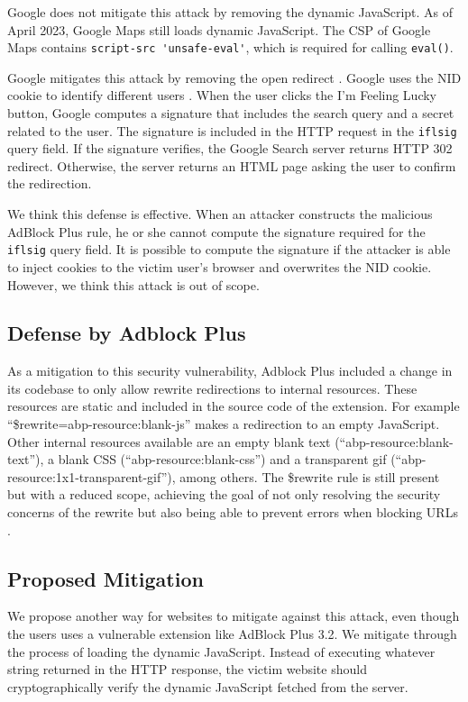 \documentclass[conference]{IEEEtran}
\begin{document}
Google does not mitigate this attack by removing the dynamic JavaScript. As of April 2023, Google Maps still loads dynamic JavaScript. The CSP of Google Maps contains \lstinline{script-src 'unsafe-eval'}, which is required for calling \lstinline{eval()}.

Google mitigates this attack by removing the open redirect \cite{superuser_ifl_redir_notice}. Google uses the NID cookie to identify different users \cite{google_cookies}. When the user clicks the I'm Feeling Lucky button, Google computes a signature that includes the search query and a secret related to the user. The signature is included in the HTTP request in the \lstinline{iflsig} query field. If the signature verifies, the Google Search server returns HTTP 302 redirect. Otherwise, the server returns an HTML page asking the user to confirm the redirection.

We think this defense is effective. When an attacker constructs the malicious AdBlock Plus rule, he or she cannot compute the signature required for the \lstinline{iflsig} query field. It is possible to compute the signature if the attacker is able to inject cookies to the victim user's browser and overwrites the NID cookie. However, we think this attack is out of scope.

\subsection{Defense by Adblock Plus}
As a mitigation to this security vulnerability, Adblock Plus included a change in its codebase to only allow rewrite redirections to internal resources. These resources are static and included in the source code of the extension. For example ``\$rewrite=abp-resource:blank-js'' makes a redirection to an empty JavaScript. Other internal resources available are an empty blank text (``abp-resource:blank-text''), a blank CSS (``abp-resource:blank-css'') and a transparent gif (``abp-resource:1x1-transparent-gif''), among others. The \$rewrite rule is still present but with a reduced scope, achieving the goal of not only resolving the security concerns of the rewrite but also being able to prevent errors when blocking URLs \cite{abp_filter_guide}. 
    
\subsection{Proposed Mitigation}

We propose another way for websites to mitigate against this attack, even though the users uses a vulnerable extension like AdBlock Plus 3.2. We mitigate through the process of loading the dynamic JavaScript. Instead of executing whatever string returned in the HTTP response, the victim website should cryptographically verify the dynamic JavaScript fetched from the server.
\end{document}

